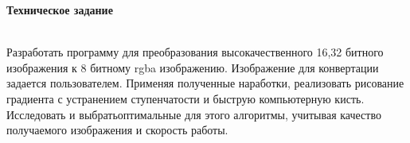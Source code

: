 \thispagestyle{empty} %
\begin{large}
\textbf{Техническое задание}
	\\\\
\end{large}
Разработать программу для преобразования высокачественного 16,32 битного изображения к
8 битному rgba изображению. Изображение для конвертации задается пользователем. Применяя полученные наработки, реализовать рисование градиента с устранением ступенчатости и быструю компьютерную кисть. Исследовать и выбратьоптимальные для этого алгоритмы, учитывая качество получаемого изображения и скорость работы. 


